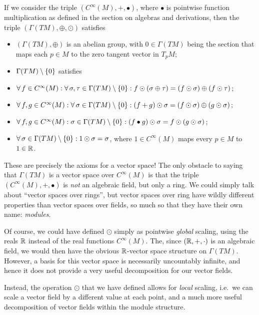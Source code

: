 If we consider the triple $(C^\infty(M),+,\bullet)$, where $\bullet$ is pointwise function multiplication as defined in the section on algebras and derivations, then the triple $(\Gamma(TM),\oplus,\odot)$ satisfies
\begin{itemize}
\item $(\Gamma(TM),\oplus)$ is an abelian group, with $0\in \Gamma(TM)$ being the section that maps each $p\in M$ to the zero tangent vector in $T_pM$;
\item $\Gamma(TM)\setminus\{0\}$ satisfies
\ben[label=\roman*)]
\item $\forall \, f \in C^\infty(M) : \forall \, \sigma,\tau \in \Gamma(TM) \setminus\{0\}: f\odot(\sigma\oplus \tau)=(f\odot \sigma)\oplus (f\odot \tau)$;
\item $\forall \, f,g \in C^\infty(M) : \forall \,  \sigma \in \Gamma(TM)\setminus\{0\}: (f+g)\odot \sigma= (f \odot \sigma) \oplus (g \odot \sigma)$;
\item $\forall \, f,g \in C^\infty(M) :  \sigma \in \Gamma(TM)\setminus\{0\} : (f\bullet g)\odot \sigma= f \odot (g \odot \sigma)$;
\item $\forall \, \sigma \in \Gamma(TM) \setminus\{0\} : 1 \odot \sigma = \sigma$,
\een
where $1\in C^\infty(M)$ maps every $p\in M$ to $1\in \mathbb{R}$.
\end{itemize}

These are precisely the axioms for a vector space! The only obstacle to saying that $\Gamma(TM)$ is a vector space over $C^\infty(M)$ is that the triple $(C^\infty(M),+,\bullet)$ is \emph{not} an algebraic field, but only a ring. We could simply talk about ``vector spaces over rings'', but vector spaces over ring have wildly different properties than vector spaces over fields, so much so that they have their own name: \emph{modules}.

\br
Of course, we could have defined $\odot$ simply as pointwise \emph{global} scaling, using the reals $\mathbb{R}$ instead of the real functions $C^\infty(M)$.
The, since $(\mathbb{R},+,\cdot)$ is an algebraic field, we would then have the obvious $\mathbb{R}$-vector space structure on $\Gamma(TM)$. However, a basis for this vector space is necessarily uncountably infinite, and hence it does not provide a very useful decomposition for our vector fields.

Instead, the operation $\odot$ that we have defined allows for \emph{local} scaling, i.e.\ we can scale a vector field by a different value at each point, and a much more useful decomposition of vector fields within the module structure.
\er


